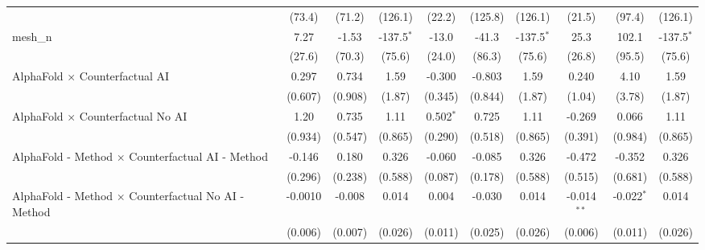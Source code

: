 \begin{tabular}{lccccccccc}
                                                               & (73.4)         & (71.2)          & (126.1)        & (22.2)        & (125.8)       & (126.1)        & (21.5)        & (97.4)          & (126.1)\\   
   mesh\_n                                                     & 7.27           & -1.53           & -137.5$^{*}$   & -13.0         & -41.3         & -137.5$^{*}$   & 25.3          & 102.1           & -137.5$^{*}$\\   
                                                               & (27.6)         & (70.3)          & (75.6)         & (24.0)        & (86.3)        & (75.6)         & (26.8)        & (95.5)          & (75.6)\\   
   AlphaFold $\times$ Counterfactual AI                        & 0.297          & 0.734           & 1.59           & -0.300        & -0.803        & 1.59           & 0.240         & 4.10            & 1.59\\   
                                                               & (0.607)        & (0.908)         & (1.87)         & (0.345)       & (0.844)       & (1.87)         & (1.04)        & (3.78)          & (1.87)\\   
   AlphaFold $\times$ Counterfactual No AI                     & 1.20           & 0.735           & 1.11           & 0.502$^{*}$   & 0.725         & 1.11           & -0.269        & 0.066           & 1.11\\   
                                                               & (0.934)        & (0.547)         & (0.865)        & (0.290)       & (0.518)       & (0.865)        & (0.391)       & (0.984)         & (0.865)\\   
   AlphaFold - Method $\times$ Counterfactual AI - Method      & -0.146         & 0.180           & 0.326          & -0.060        & -0.085        & 0.326          & -0.472        & -0.352          & 0.326\\   
                                                               & (0.296)        & (0.238)         & (0.588)        & (0.087)       & (0.178)       & (0.588)        & (0.515)       & (0.681)         & (0.588)\\   
   AlphaFold - Method $\times$ Counterfactual No AI - Method   & -0.0010        & -0.008          & 0.014          & 0.004         & -0.030        & 0.014          & -0.014$^{**}$ & -0.022$^{*}$    & 0.014\\   
                                                               & (0.006)        & (0.007)         & (0.026)        & (0.011)       & (0.025)       & (0.026)        & (0.006)       & (0.011)         & (0.026)\\   

\end{tabular}
